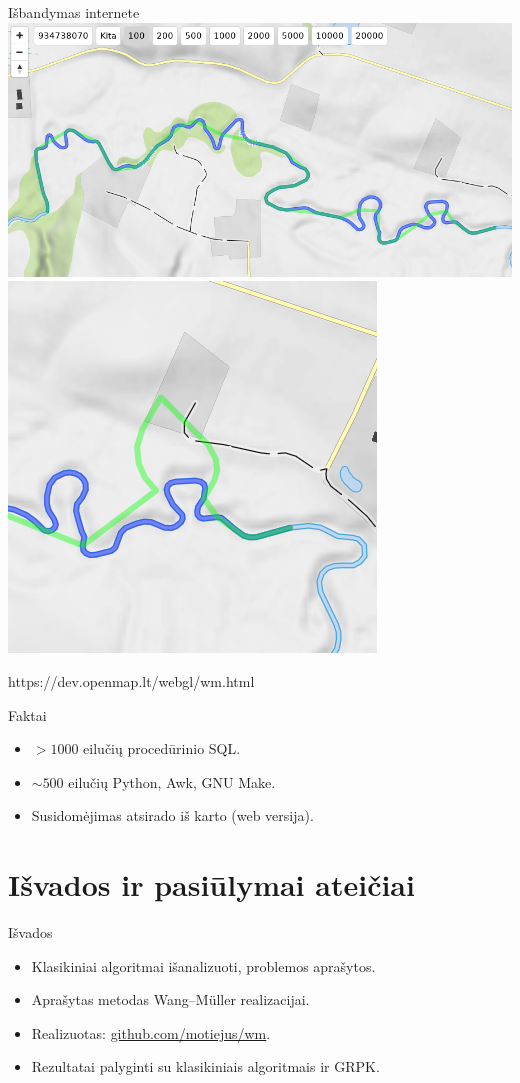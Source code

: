 \documentclass[14pt]{beamer}
\newcommand{\WM}{Wang--M{\"u}ller}
\begin{document}
\begin{frame}{Išbandymas internete}
  \centering
  \includegraphics[width=.75\textwidth]{openmap-wm-good.png}
  \includegraphics[width=.3\textwidth]{openmap-wm-bad.png}

  {\tiny https://dev.openmap.lt/webgl/wm.html}
\end{frame}

\begin{frame}{Faktai}
  \begin{itemize}
    \item $>1000$ eilučių procedūrinio SQL.
    \item $\sim500$ eilučių Python, Awk, GNU Make.
    \item Susidomėjimas atsirado iš karto (web versija).
  \end{itemize}
\end{frame}

\section{Išvados ir pasiūlymai ateičiai}

\begin{frame}{Išvados}
  \begin{itemize}
    \item Klasikiniai algoritmai išanalizuoti, problemos aprašytos.
    \item Aprašytas metodas {\WM} realizacijai.

    \item Realizuotas:
      \href{https://github.com/motiejus/wm}{github.com/motiejus/wm}.

    \item Rezultatai palyginti su klasikiniais algoritmais ir GRPK.
  \end{itemize}
\end{frame}
\end{document}
